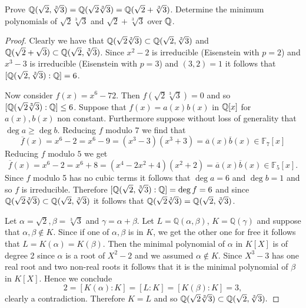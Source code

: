     \begin{ex}{21.28}
        Prove $\mathbb{Q}(\sqrt{2},\sqrt[3]{3})=\mathbb{Q}(\sqrt{2}\sqrt[3]{3})=\mathbb{Q}(\sqrt{2}+\sqrt[3]{3})$.
        Determine the minimum polynomials of $\sqrt{2}\sqrt[3]{3}$ and $\sqrt{2}+\sqrt[3]{3}$ over $\mathbb{Q}$.
    \end{ex}
    \begin{proof}
        Clearly we have that $\mathbb{Q}(\sqrt{2}\sqrt[3]{3})\subset\mathbb{Q}(\sqrt{2},\sqrt[3]{3})$ 
        and $\mathbb{Q}(\sqrt{2}+\sqrt{3})\subset\mathbb{Q}(\sqrt{2},\sqrt[3]{3})$. 
        Since $x^2-2$ is irreducible (Eisenstein with $p=2$) and $x^3-3$ is irreducible (Eisenstein with $p=3$) and $(3,2)=1$ it follows that $[\mathbb{Q}(\sqrt{2},\sqrt[3]{3}):\mathbb{Q}]=6$.

        Now consider $f(x)=x^6-72$. Then $f(\sqrt{2}\sqrt[3]{3})=0$ and so $[\mathbb{Q}(\sqrt{2}\sqrt[3]{3}):\mathbb{Q}]\leq 6$.
        Suppose that $f(x)=a(x)b(x)$ in $\mathbb{Q}[x]$ for $a(x),b(x)$ non constant. Furthermore suppose without loss of generality that $\deg a\geq \deg b$.
        Reducing $f$ modulo $7$ we find that 
        $$\overline{f}(x)=x^6-2=x^6-9=(x^3-3)(x^3+3)=\overline{a}(x)\overline{b}(x)\in\mathbb{F}_7[x]$$
        Reducing $f$ modulo $5$ we get
        $$\overline{f}(x)=x^6-2=x^6+8=(x^4-2x^2+4)(x^2+2)=\overline{a}(x)\overline{b}(x)\in\mathbb{F}_5[x].$$
        Since $f$ modulo 5 has no cubic terms it follows that $\deg a = 6$ and $\deg b = 1$ and so $f$ is irreducible. Therefore $[\mathbb{Q}(\sqrt{2},\sqrt[3]{3}):\mathbb{Q}]=\deg f=6$
        and since $\mathbb{Q}(\sqrt{2}\sqrt[3]{3})\subset\mathbb{Q}(\sqrt{2},\sqrt[3]{3})$ it follows that $\mathbb{Q}(\sqrt{2}\sqrt[3]{3})=\mathbb{Q}(\sqrt{2},\sqrt[3]{3})$. 

        Let $\alpha=\sqrt{2},\beta=\sqrt[3]{3}$ and $\gamma=\alpha+\beta$. Let $L=\mathbb{Q}(\alpha, \beta)$, $K=\mathbb{Q}(\gamma)$ and suppose that $\alpha,\beta\not\in K$. Since if one of $\alpha,\beta$ is in $K$, we get the other one for free it follows that $L=K(\alpha)=K(\beta)$. Then the minimal polynomial of $\alpha$ in $K[X]$ is of degree 2 since $\alpha$ is a root of $X^2-2$ and we assumed $\alpha\not\in K$. Since $X^3-3$ has one real root and two non-real roots it follows that it is the minimal polynomial of $\beta$ in $K[X]$. Hence we conclude
        $$2=[K(\alpha):K]=[L:K]=[K(\beta):K]=3,$$
        clearly a contradiction. Therefore $K=L$ and so
        $\mathbb{Q}(\sqrt{2}\sqrt[3]{3})\subset\mathbb{Q}(\sqrt{2},\sqrt[3]{3}).$
    \end{proof}

